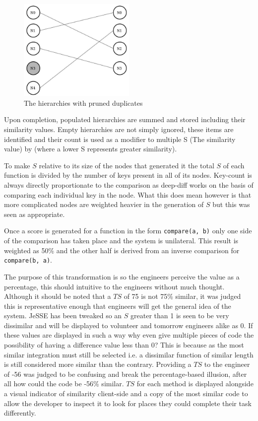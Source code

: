 \documentclass[jou,apacite]{apa6}
\begin{document}
\begin{figure}[h]
\caption{The hierarchies with pruned duplicates}
\centering
\includegraphics[width=0.50\textwidth]{hierarchies}
\end{figure}

Upon completion, populated hierarchies are summed and stored including their similarity values. Empty hierarchies are not simply ignored, these items are identified and their count is used as a modifier to multiple S (The similarity value) by (where a lower S represents greater similarity).  

To make $S$ relative to its size of the nodes that generated it the total $S$ of each function is divided by the number of keys present in all of its nodes. Key-count is always directly proportionate to the comparison as deep-diff works on the basis of comparing each individual key in the node. What this does mean however is that more complicated nodes are weighted heavier in the generation of $S$ but this was seen as appropriate.

Once a score is generated for a function in the form \texttt{compare(a, b)} only one side of the comparison has taken place and the system is unilateral. This result is weighted as 50\% and the other half is derived from an inverse comparison for \texttt{compare(b, a)}.


The purpose of this transformation is so the engineers perceive the value as a percentage, this should intuitive to the engineers without much thought. Although it should be noted that a $TS$ of 75 is not 75\% similar, it was judged this is representative enough that engineers will get the general idea of the system. JeSSE has been tweaked so an $S$ greater than 1 is seen to be very dissimilar and will be displayed to volunteer and tomorrow engineers alike as 0. If these values are displayed in such a way why even give multiple pieces of code the possibility of having a difference value less than 0? This is because as the most similar integration must still be selected i.e. a dissimilar function of similar length is still considered more similar than the contrary. Providing a $TS$ to the engineer of -56 was judged to be confusing and break the percentage-based illusion, after all how could the code be -56\% similar. $TS$ for each method is displayed alongside a visual indicator of similarity client-side and a copy of the most similar code to allow the developer to inspect it to look for places they could complete their task differently. 
\end{document}
